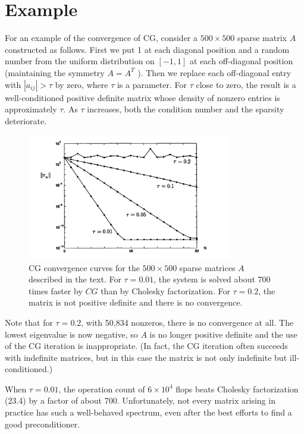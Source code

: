 \section{Example} 
For an example of the convergence of CG, consider a $500 \times 500$ sparse matrix $A$ constructed as follows. First we put 1 at each diagonal position and a random number from the uniform distribution on $[-1,1]$ at each off-diagonal position (maintaining the symmetry $A=A^T$ ). Then we replace each off-diagonal entry with $\left|a_{i j}\right|>\tau$ by zero, where $\tau$ is a parameter. For $\tau$ close to zero, the result is a well-conditioned positive definite matrix whose density of nonzero entries is approximately $\tau$. As $\tau$ increases, both the condition number and the sparsity deteriorate. 

\begin{figure}[H]
    \centering
    \includegraphics[width=0.8\textwidth]{figures/38-1.png}
    \caption{CG convergence curves for the $500 \times 500$ sparse matrices $A$ described in the text. For $\tau=0.01$, the system is solved about 700 times faster by $C G$ than by Cholesky factorization. For $\tau=0.2$, the matrix is not positive definite and there is no convergence.}
\end{figure}

Note that for $\tau=0.2$, with 50,834 nonzeros, there is no convergence at all. The lowest eigenvalue is now negative, so $A$ is no longer positive definite and the use of the CG iteration is inappropriate. (In fact, the CG iteration often succeeds with indefinite matrices, but in this case the matrix is not only indefinite but ill-conditioned.)

When $ \tau=0.01 $, the operation count of $6 \times 10^4$ flops beats Cholesky factorization (23.4) by a factor of about 700. Unfortunately, not every matrix arising in practice has such a well-behaved spectrum, even after the best efforts to find a good preconditioner.